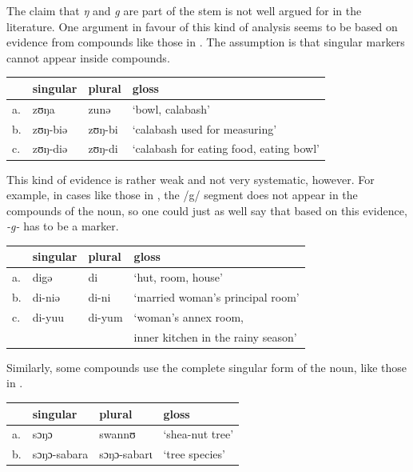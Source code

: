The claim that \textit{ŋ} and \textit{g} are part of the stem is not well argued for in the literature. One argument in favour of this kind of analysis seems to be based on evidence from compounds like those in . The assumption is that singular markers cannot appear inside compounds.

\begin{exe}
    \ex \label{ng-deletion}
    \begin{tabular}[t]{llll}
      & singular & plural & gloss \\
      \midrule
      a. & zʊŋa     & zunə   & `bowl, calabash'       \\
      b. & zʊŋ-biə  & zʊŋ-bi & `calabash used for measuring'        \\
      c. & zʊŋ-diə  & zʊŋ-di & `calabash for eating food, eating bowl'        \\
    \end{tabular}
\end{exe}

This kind of evidence is rather weak and not very systematic, however. For example, in cases like those in , the /g/ segment does not appear in the compounds of the noun, so one could just as well say that based on this evidence, \textit{-g-} has to be a marker.

\begin{exe}
    \ex \label{no-g-deletion}
    \begin{tabular}[t]{llll}
         & singular & plural & gloss                                \\
      \midrule
      a. & digə     & di     & `hut, room, house'                   \\
      b. & di-niə   & di-ni  & `married woman's principal room'     \\
      c. & di-yuu   & di-yum & `woman's annex room,                  \\
         &          &        &  inner kitchen in the rainy season' \\
    \end{tabular}
\end{exe}

Similarly, some compounds use the complete singular form of the noun, like those in .

\begin{exe}
    \ex \label{ng-in-compound}
    \begin{tabular}[t]{llll}
      & singular    & plural      & gloss           \\
      \midrule
      a. & sɔŋɔ        & swannʊ      & `shea-nut tree' \\
      b. & sɔŋɔ-sabara & sɔŋɔ-sabarɩ & `tree species'  \\
    \end{tabular}
\end{exe}

